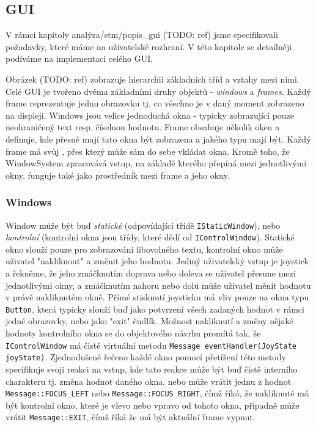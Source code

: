 
\subsection{GUI}

V rámci kapitoly analýza/stm/popis_gui (TODO: ref) jsme specifikovali požadavky, které máme na uživatelské
rozhraní.
V této kapitole se detailněji podíváme na implementaci celého GUI.


Obrázek (TODO: ref) zobrazuje hierarchii základních tříd a vztahy mezi nimi.
Celé GUI je tvořeno dvěma základními druhy objektů - \emph{windows} a \emph{frames}.
Každý frame reprezentuje jednu obrazovku tj. co všechno je v daný moment zobrazeno na displeji.
Windows jsou velice jednoduchá okna - typicky zobrazující pouze neohraničený text resp. číselnou
hodnotu.
Frame obsahuje několik oken a definuje, kde přesně mají tato okna být zobrazena a jakého typu
mají být.
Každý frame má svůj , přes který může sám do sebe vkládat okna.
Kromě toho, že WindowSystem zpracovává vstup, na základě kterého přepíná mezi jednotlivými okny,
funguje také jako prostředník mezi frame a jeho okny.

\subsubsection{Windows}
Window může být buď \emph{statické} (odpovídající třídě \texttt{IStaticWindow}), nebo \emph{kontrolní}
(kontrolní okna jsou třídy, které dědí od \texttt{IControlWindow}).
Statické okno slouží pouze pro zobrazování libovolného textu, kontrolní okno může uživatel "nakliknout"
a změnit jeho hodnotu.
Jediný uživatelský vstup je joystick a řekněme, že jeho zmáčknutím doprava nebo doleva se uživatel
přesune mezi jednotlivými okny, a zmáčknutím nahoru nebo dolů může uživatel měnit hodnotu
v právě nakliknutém okně.
Přímé stisknutí joysticku má vliv pouze na okna typu \texttt{Button}, která typicky slouží buď jako
potvrzení všech zadaných hodnot v rámci jedné obrazovky, nebo jako "exit" čudlík.
Možnost nakliknutí a změny nějaké hodnoty kontrolního okna se do objektového návrhu promítá tak,
že \texttt{IControlWindow} má čistě virtuální metodu \texttt{Message eventHandler(JoyState joyState)}.
Zjednodušeně řečeno každé okno pomocí přetížení této metody specifikuje svoji reakci na vstup,
kde tato reakce může být buď čistě interního charakteru tj. změna hodnot daného okna, nebo může
vrátit jednu z hodnot \texttt{Message::FOCUS\_LEFT} nebo \texttt{Message::FOCUS\_RIGHT}, čímž
říká, že nakliknuté má být kontrolní okno, které je vlevo nebo vpravo od tohoto okna, případně
může vrátit \texttt{Message::EXIT}, čímž říká že má být aktuální frame vypnut.

